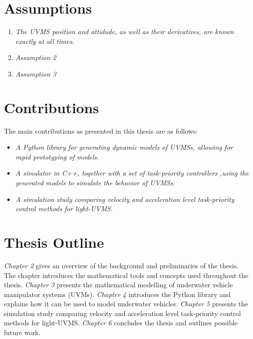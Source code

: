 
\section{Assumptions}
\begin{enumerate}
    \item \emph{The UVMS position and attidude, as well as their derivatives, are
        known exactly at all times.}
    \item \emph{Assumption 2}
    \item \emph{Assumption 3}
\end{enumerate}

\section{Contributions}

The main contributions as presented in this thesis are as follows:
\begin{itemize}
    \item \emph{A Python library for generating dynamic models of UVMSs, allowing
        for rapid prototyping of models.}
    \item \emph{A simulator in C++, together with a set of task-priority controllers
        ,using the generated models to simulate the behavior of UVMSs.}
    \item \emph{A simulation study comparing velocity and acceleration level
        task-priority control methods for light-UVMS.}
\end{itemize}

\section{Thesis Outline}

\emph{Chapter 2} gives an overview of the background and preliminaries of the
thesis. The chapter introduces the mathematical tools and concepts used throughout
the thesis. \emph{Chapter 3} presents the mathematical modelling of underwater
vehicle manipulator systems (UVMs). \emph{Chapter 4} introduces the Python library
\pymuvs and explains how it can be used to model underwater vehicles. \emph{Chapter 5}
presents the simulation study comparing velocity and acceleration level task-priority
control methods for light-UVMS. \emph{Chapter 6} concludes the thesis and outlines
possible future work.
